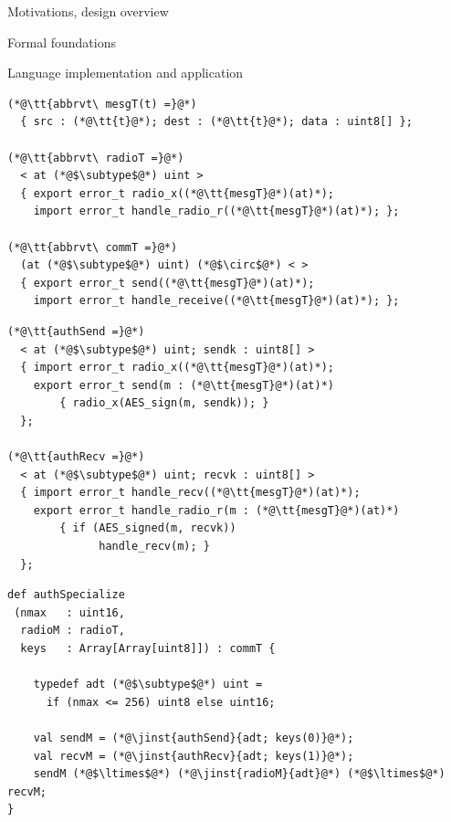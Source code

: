 
\begin{cenumerate}
\item Motivations, design overview
\item {}
\begin{citemize}
\item {} 
\item Formal foundations
\end{citemize}
\item Language implementation and application
\end{cenumerate}
\stopslide


\begin{lstlisting}[language=nesC]
(*@\tt{abbrvt\ mesgT(t) =}@*)
  { src : (*@\tt{t}@*); dest : (*@\tt{t}@*); data : uint8[] };

(*@\tt{abbrvt\ radioT =}@*)
  < at (*@$\subtype$@*) uint >
  { export error_t radio_x((*@\tt{mesgT}@*)(at)*); 
    import error_t handle_radio_r((*@\tt{mesgT}@*)(at)*); };

(*@\tt{abbrvt\ commT =}@*)
  (at (*@$\subtype$@*) uint) (*@$\circ$@*) < >
  { export error_t send((*@\tt{mesgT}@*)(at)*); 
    import error_t handle_receive((*@\tt{mesgT}@*)(at)*); };
\end{lstlisting}
\stopslide


\begin{lstlisting}[language=nesC]
(*@\tt{authSend =}@*)
  < at (*@$\subtype$@*) uint; sendk : uint8[] >  
  { import error_t radio_x((*@\tt{mesgT}@*)(at)*);
    export error_t send(m : (*@\tt{mesgT}@*)(at)*) 
        { radio_x(AES_sign(m, sendk)); }
  };

(*@\tt{authRecv =}@*)
  < at (*@$\subtype$@*) uint; recvk : uint8[] >  
  { import error_t handle_recv((*@\tt{mesgT}@*)(at)*);
    export error_t handle_radio_r(m : (*@\tt{mesgT}@*)(at)*) 
        { if (AES_signed(m, recvk))
              handle_recv(m); }
  };
\end{lstlisting}
\stopslide


\begin{lstlisting}[language=scalaness]
def authSpecialize
 (nmax   : uint16,
  radioM : radioT,
  keys   : Array[Array[uint8]]) : commT {

    typedef adt (*@$\subtype$@*) uint =
      if (nmax <= 256) uint8 else uint16;

    val sendM = (*@\jinst{authSend}{adt; keys(0)}@*);
    val recvM = (*@\jinst{authRecv}{adt; keys(1)}@*);
    sendM (*@$\ltimes$@*) (*@\jinst{radioM}{adt}@*) (*@$\ltimes$@*) recvM;
}
\end{lstlisting}
\stopslide

